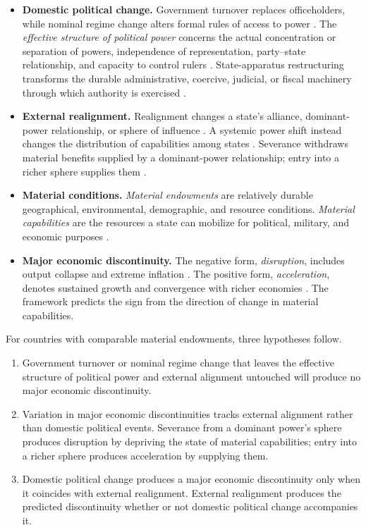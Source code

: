 \documentclass[11pt]{article}
\begin{document}
\begin{itemize}[leftmargin=1.5em]
    \item \textbf{Domestic political change.} Government turnover replaces officeholders, while nominal regime change alters formal rules of access to power \parencite{linz_stepan_1996,linz_2000}. The \emph{effective structure of political power} concerns the actual concentration or separation of powers, independence of representation, party--state relationship, and capacity to control rulers \parencite{garciatrevijano2010}. State-apparatus restructuring transforms the durable administrative, coercive, judicial, or fiscal machinery through which authority is exercised \parencite{skocpol_1979,althusser_1971}.
    \item \textbf{External realignment.} Realignment changes a state's alliance, dominant-power relationship, or sphere of influence \parencite{walt_1987,keal_1983}. A systemic power shift instead changes the distribution of capabilities among states \parencite{waltz_1979,gilpin_1981}. Severance withdraws material benefits supplied by a dominant-power relationship; entry into a richer sphere supplies them \parencite{lake_2009}.
    \item \textbf{Material conditions.} \emph{Material endowments} are relatively durable geographical, environmental, demographic, and resource conditions. \emph{Material capabilities} are the resources a state can mobilize for political, military, and economic purposes \parencite{diamond_1997,mearsheimer_2001}.
    \item \textbf{Major economic discontinuity.} The negative form, \emph{disruption}, includes output collapse and extreme inflation \parencite{rodrik_1999}. The positive form, \emph{acceleration}, denotes sustained growth and convergence with richer economies \parencite{hausmann_pritchett_rodrik_2005}. The framework predicts the sign from the direction of change in material capabilities.
\end{itemize}

For countries with comparable material endowments, three hypotheses follow.

\begin{enumerate}[leftmargin=1.8em,label=\textbf{H\arabic*.}]
    \item Government turnover or nominal regime change that leaves the effective structure of political power and external alignment untouched will produce no major economic discontinuity.
    \item Variation in major economic discontinuities tracks external alignment rather than domestic political events. Severance from a dominant power's sphere produces disruption by depriving the state of material capabilities; entry into a richer sphere produces acceleration by supplying them.
    \item Domestic political change produces a major economic discontinuity only when it coincides with external realignment. External realignment produces the predicted discontinuity whether or not domestic political change accompanies it.
\end{enumerate}
\end{document}
